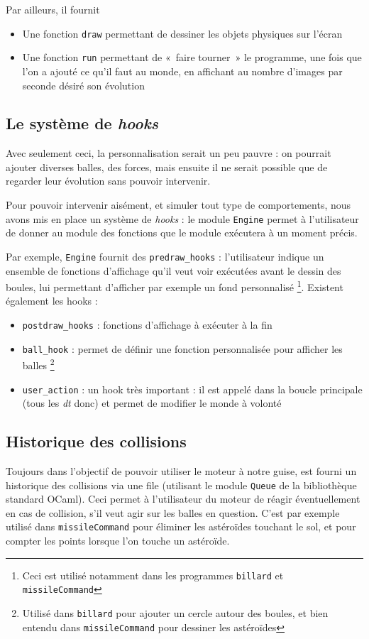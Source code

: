 \documentclass[a4paper]{scrartcl}
\begin{document}
Par ailleurs, il fournit 
\begin{itemize}
\item Une fonction \texttt{draw} permettant de dessiner les objets
  physiques sur l'écran
\item Une fonction \texttt{run} permettant de «~faire tourner~» le
  programme, une fois que l'on a ajouté ce qu'il faut au monde, en
  affichant au nombre d'images par seconde désiré son évolution
\end{itemize}

\subsection{Le système de \emph{hooks}}
Avec seulement ceci, la personnalisation serait un peu pauvre : on
pourrait ajouter diverses balles, des forces, mais ensuite il ne
serait possible que de regarder leur évolution sans pouvoir
intervenir.

Pour pouvoir intervenir aisément, et simuler tout type de
comportements, nous avons mis en place un système de \emph{hooks} : le
module \texttt{Engine} permet à l'utilisateur de donner au module des
fonctions que le module exécutera à un moment précis.

Par exemple, \texttt{Engine} fournit des \texttt{predraw\_hooks} :
l'utilisateur indique un ensemble de fonctions d'affichage qu'il veut
voir exécutées avant le dessin des boules, lui permettant d'afficher
par exemple un fond personnalisé \footnote{Ceci est utilisé notamment
  dans les programmes \texttt{billard} et \texttt{missileCommand}}.
Existent également les hooks :
\begin{itemize}
\item \texttt{postdraw\_hooks} : fonctions d'affichage à exécuter à la fin
\item \texttt{ball\_hook} : permet de définir une fonction
  personnalisée pour afficher les balles \footnote{Utilisé dans
    \texttt{billard} pour ajouter un cercle autour des boules, et bien
    entendu dans \texttt{missileCommand} pour dessiner les astéroïdes}
\item \texttt{user\_action} : un hook très important : il est appelé
  dans la boucle principale (tous les \emph{dt} donc) et permet de
  modifier le monde à volonté
\end{itemize}

\subsection{Historique des collisions}
Toujours dans l'objectif de pouvoir utiliser le moteur à notre guise,
est fourni un historique des collisions via une file (utilisant le
module \texttt{Queue} de la bibliothèque standard OCaml). Ceci permet
à l'utilisateur du moteur de réagir éventuellement en cas de
collision, s'il veut agir sur les balles en question. C'est par
exemple utilisé dans \texttt{missileCommand} pour éliminer les
astéroïdes touchant le sol, et pour compter les points lorsque l'on
touche un astéroïde.
\end{document}
